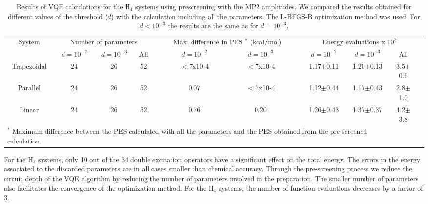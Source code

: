 \documentclass[superscriptaddress,aps,pra,twocolumn,nofootinbib,babel]{revtex4-1}
\begin{document}
\begin{table}[h]
\caption{Results of VQE calculations for the H$_4$ systems using prescreening with the MP2 amplitudes. We compared the results obtained for different values of the threshold ($d$) with the calculation including all the parameters. The L-BFGS-B optimization method was used. For $d<10^{-3}$ the results are the same as for $d=10^{-3}$.}\label{tab:mp2screening}
\begin{tabular}{cccccccccccc}
\hline
System & \multicolumn{3}{c}{Number of parameters} && \multicolumn{2}{c}{Max. difference in PES $^{*}$ (kcal/mol)} && \multicolumn{3}{c}{Energy evaluations x $10^3$ } \\
\cline{2-4}\cline{6-7}\cline{9-11}
& $d=10^{-2}$ & $d=10^{-3}$ & All && $d=10^{-2}$ & $d=10^{-3}$ && $d=10^{-2}$ & $d=10^{-3}$ & All\\
\hline
Trapezoidal & 24 & 26 & 52 && $<$7x10-4 & $<$7x10-4 &&  1.17$\pm$0.11 & 1.20$\pm$0.13 & 3.5$\pm$0.6\\
Parallel & 24 & 26 & 52 && 0.07 & $<$7x10-4 && 1.12$\pm$0.44 &  1.17$\pm$0.43 & 2.8$\pm$1.0 \\
Linear & 24 & 26 & 52 && 0.76 & 0.20 && 1.26$\pm$0.43 & 1.37$\pm$0.37 & 4.2$\pm$3.8 \\
\hline
\multicolumn{10}{l}{$^*$ {\footnotesize Maximum difference between the PES calculated with all the parameters and the PES obtained from the pre-screened calculation.}} \\
\hline
\end{tabular}
\end{table}

For the H$_4$ systems, only 10 out of the 34 double excitation operators have a significant effect on the total energy. The errors in the energy associated to the discarded parameters are in all cases smaller than chemical accuracy. Through the pre-screening process we reduce the circuit depth of the VQE algorithm by reducing the number of parameters involved in the preparation. The smaller number of parameters also facilitates the convergence of the optimization method. For the H$_4$ systems, the number of function evaluations decreases by a factor of 3.
\end{document}
